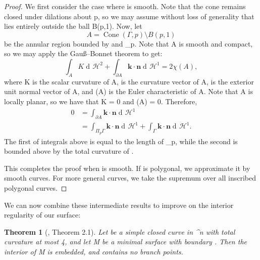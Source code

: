 \documentclass[a4paper, 11pt]{article}
\theoremstyle{plain}
\newtheorem{theorem}{Theorem}[section]
\theoremstyle{definition}
\theoremstyle{remark}
\DeclareMathOperator{\diff}{d \!}
\numberwithin{equation}{subsection}
\def\({}
\def\){}
\def\pi{}
\begin{document}
\begin{proof}
We first consider the case where \(\Gamma\) is smooth. Note that the cone remains closed under dilations about \(p\), so we may assume without loss of generality that \(\Gamma\) lies entirely outside the ball \(B(p,1)\). Now, let
\begin{equation}
A = \operatorname{Cone}(\Gamma, p) \setminus B(p,1)
\end{equation}
be the annular region bounded by \(\Gamma\) and \(\Pi_{p}\Gamma\). Note that \(A\) is smooth and compact, so we may apply the Gau\ss--Bonnet theorem to get:
\begin{equation}
\int_{A}K \diff\mathcal{H}^{2} + \int_{\partial A} \mathbf{k} \cdot \mathbf{n} \diff \mathcal{H}^{1} = 2\pi\chi(A),
\end{equation}
where \(K\) is the scalar curvature of \(A\), \(\) is the curvature vector of \(\partial A\), \(\) is the exterior unit normal vector of \(A\), and \(\chi(A)\) is the Euler characteristic of \(A\). Note that \(A\) is locally planar, so we have that \(K = 0\) and \(\chi(A) = 0\). Therefore,
\begin{align*}
0 &= \int_{\partial A} \mathbf{k} \cdot \mathbf{n} \diff \mathcal{H}^{1} \\
&= \int_{\Pi_{p}\Gamma} \mathbf{k} \cdot \mathbf{n} \diff \mathcal{H}^{1} + \int_{\Gamma} \mathbf{k} \cdot \mathbf{n} \diff \mathcal{H}^{1}. 
\end{align*}
The first of integrals above is equal to the length of \(\Pi_{p}\Gamma\), while the second is bounded above by the total curvature of \(\Gamma\). 

This completes the proof when \(\Gamma\) is smooth. If \(\Gamma\) is polygonal, we approximate it by smooth curves. For more general curves, we take the supremum over all inscribed polygonal curves.
\end{proof}


We can now combine these intermediate results to improve on the interior regularity of our surface:

\begin{theorem}[\cite{EWW02}, Theorem 2.1]
\label{Interior_Regularity_3}
Let \(\Gamma\) be a simple closed curve in \(^{n}\) with total curvature at most \(4\pi\), and let \(M\) be a minimal surface with boundary \(\Gamma\). Then the interior of \(M\) is embedded, and contains no branch points.
\end{theorem}
\end{document}
